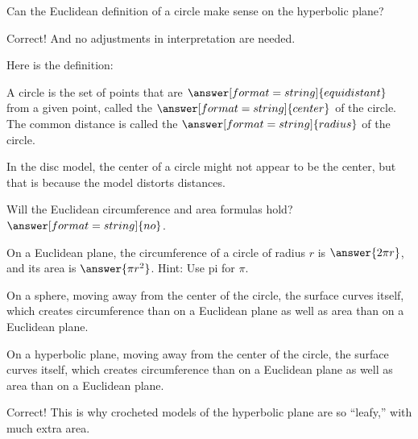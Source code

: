 \documentclass{ximera}
\begin{document}
\begin{problem}
Can the Euclidean definition of a circle make sense on the hyperbolic plane?  
\begin{multipleChoice}
\end{multipleChoice}
\begin{problem}
Correct! And no adjustments in interpretation are needed.

Here is the definition:  

A circle is the set of points that are $\answer[format=string]{equidistant}$ from a given point, called the $\answer[format=string]{center}$ of the circle.  The common distance is called the $\answer[format=string]{radius}$ of the circle.  

In the disc model, the center of a circle might not appear to be the center, but that is because the model distorts distances.  

\begin{problem}
Will the Euclidean circumference and area formulas hold?  
$\answer[format=string]{no}$. 
\begin{problem}
On a Euclidean plane, the circumference of a circle of radius $r$ is $\answer{2\pi r}$, and its area is $\answer{\pi r^2}$.  Hint: Use pi for $\pi$. 

On a sphere, moving away from the center of the circle, the surface curves  itself, which creates  circumference than on a Euclidean plane as well as  area than on a Euclidean plane.  

On a hyperbolic plane, moving away from the center of the circle, the surface curves  itself, which creates  circumference than on a Euclidean plane as well as  area than on a Euclidean plane.  
\begin{feedback}[correct]
Correct!  This is why crocheted models of the hyperbolic plane are so ``leafy,'' with much extra area.  
\end{feedback}

\end{problem}
\end{problem}
\end{problem}
\end{problem}
\end{document}
